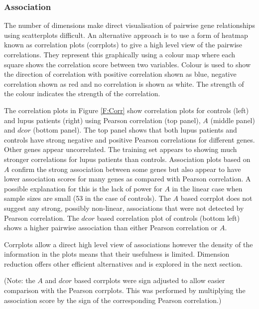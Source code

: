 \documentclass[a4paper, 12pt]{report}
\begin{document}
\subsubsection{Association}
The number of dimensions make direct visualisation of pairwise gene relationships using scatterplots difficult. An alternative approach is to use a form of heatmap known as correlation plots (corrplots) to  give a high level view of the pairwise correlations. They represent this graphically using a colour map where each square shows the correlation score between two variables. Colour is used to show the direction of correlation with positive correlation shown as blue, negative correlation shown as red and no correlation is shown as white. The strength of the colour indicates the strength of the correlation. 

The correlation plots in Figure \ref{F:Corr} show correlation plots for controls (left) and lupus patients (right) using Pearson correlation (top panel), $A$ (middle panel) and $dcor$ (bottom panel). The top panel shows that both lupus patients and controls have strong negative and positive Pearson correlations for different genes. Other genes appear uncorrelated. The training set appears to showing much stronger correlations for lupus patients than controls. Association plots based on $A$ confirm the strong association between some genes but also appear to have lower association scores for many genes as compared with Pearson correlation. A possible explanation for this is the lack of power for $A$ in the linear case when sample sizes are small (53 in the case of controls). The $A$ based corrplot does not suggest any strong, possibly non-linear, associations that were not detected by Pearson correlation. The $dcor$ based correlation plot of controls (bottom left) shows a higher pairwise association than either Pearson correlation or $A$. 

Corrplots allow a direct high level view of associations however the density of the information in the plots means that their usefulness is limited.  Dimension reduction offers other efficient alternatives and is explored in the next section. 

(Note: the $A$ and $dcor$ based corrplots were sign adjusted to allow easier comparison with the Pearson corrplots. This was performed by multiplying the association score by the sign of the corresponding Pearson correlation.) 

\end{document}
